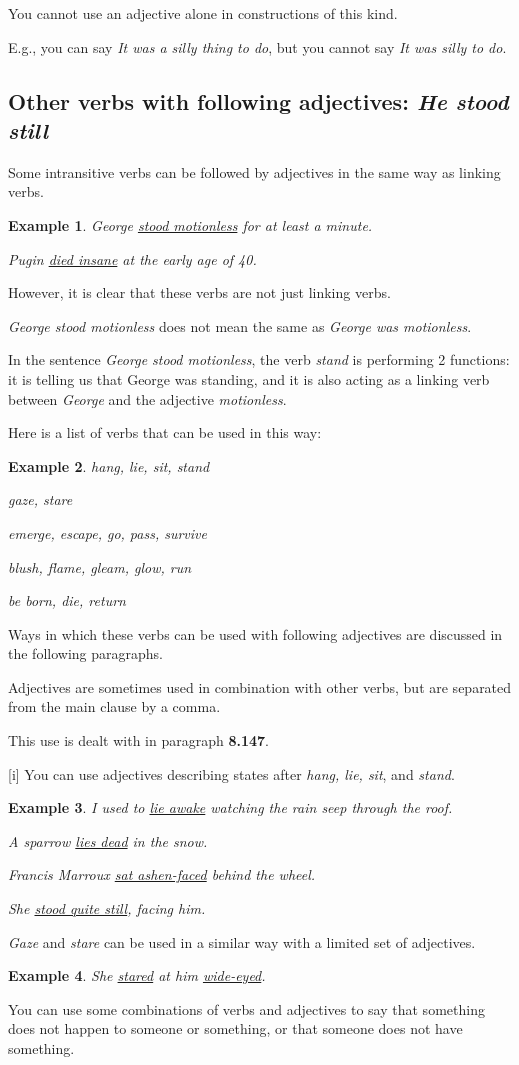\documentclass[oneside]{book}
\numberwithin{equation}{section}
\newtheorem{example}{Example}[section]
\begin{document}
%
You cannot use an adjective alone in constructions of this kind.

E.g., you can say \textit{It was a silly thing to do}, but you cannot say \textit{It was silly to do}.

\subsection{Other verbs with following adjectives: \textit{He stood still}}
\noindent{} Some intransitive verbs can be followed by adjectives in the same way as linking verbs.
\begin{example}
    George \underline{stood motionless} for at least a minute.
    
    Pugin \underline{died insane} at the early age of 40.
\end{example}
However, it is clear that these verbs are not just linking verbs.

\textit{George stood motionless} does not mean the same as \textit{George was motionless}.

In the sentence \textit{George stood motionless}, the verb \textit{stand} is performing 2 functions: it is telling us that George was standing, and it is also acting as a linking verb between \textit{George} and the adjective \textit{motionless}.

%
Here is a list of verbs that can be used in this way:
\begin{example}
    hang, lie, sit, stand
    
    gaze, stare
    
    emerge, escape, go, pass, survive
    
    blush, flame, gleam, glow, run
    
    be born, die, return
\end{example}
Ways in which these verbs can be used with following adjectives are discussed in the following paragraphs.

%
Adjectives are sometimes used in combination with other verbs, but are separated from the main clause by a comma.

This use is dealt with in paragraph \textbf{8.147}.

%
\noindent{} [i] You can use adjectives describing states after \textit{hang, lie, sit}, and \textit{stand}.
\begin{example}
    I used to \underline{lie awake} watching the rain seep through the roof.
    
    A sparrow \underline{lies dead} in the snow.
    
    Francis Marroux \underline{sat ashen-faced} behind the wheel.
    
    She \underline{stood quite still}, facing him.
\end{example}
\textit{Gaze} and \textit{stare} can be used in a similar way with a limited set of adjectives.
\begin{example}
    She \underline{stared} at him \underline{wide-eyed}.
\end{example}
%
\noindent{} You can use some combinations of verbs and adjectives to say that something does not happen to someone or something, or that someone does not have something.
\end{document}
